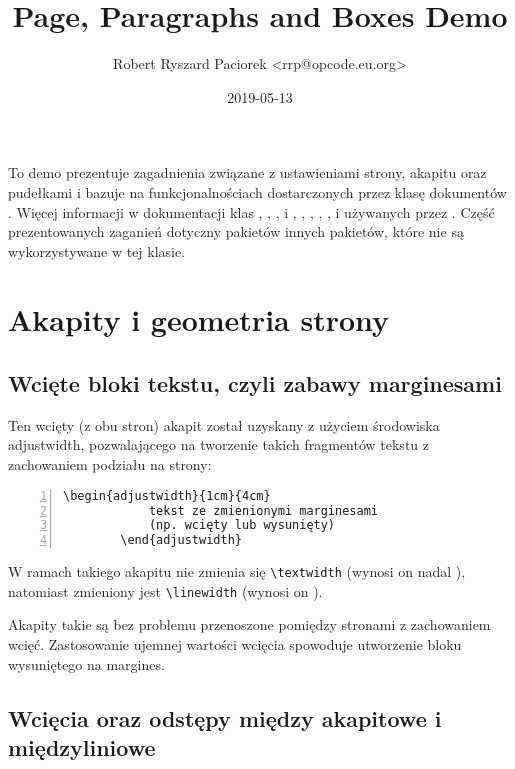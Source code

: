 \documentclass[fontSize=10pt,extra]{pdfArticle}
\title {Page, Paragraphs and Boxes Demo}
\author{Robert Ryszard Paciorek <rrp@opcode.eu.org>}
\date  {2019-05-13}
\begin{document}
To demo prezentuje zagadnienia związane z ustawieniami strony, akapitu oraz pudełkami i bazuje na funkcjonalnościach dostarczonych przez klasę dokumentów .
Więcej informacji w dokumentacji klas , , ,  i , , , , ,  i  używanych przez . Część prezentowanych zaganień dotyczny pakietów innych pakietów, które nie są wykorzystywane w tej klasie.

\section{Akapity i geometria strony}

\subsection{Wcięte bloki tekstu, czyli zabawy marginesami}

\begin{adjustwidth}{1cm}{4cm}
	Ten wcięty (z obu stron) akapit został uzyskany z użyciem środowiska adjustwidth,
	pozwalającego na tworzenie takich fragmentów tekstu z zachowaniem podziału na strony:
	
	\begin{minipage}{\linewidth}
	\begin{Verbatim}[gobble=2,numbers=left,numbersep=4pt,fontsize=\footnotesize]
		\begin{adjustwidth}{1cm}{4cm}
			tekst ze zmienionymi marginesami
			(np. wcięty lub wysunięty)
		\end{adjustwidth}
	\end{Verbatim}
	\end{minipage}
	
	W ramach takiego akapitu nie zmienia się \Verb#\textwidth# (wynosi on nadal \the\textwidth), natomiast zmieniony jest \Verb#\linewidth# (wynosi on \the\linewidth).
	
	Akapity takie są bez problemu przenoszone pomiędzy stronami z zachowaniem wcięć.
	Zastosowanie ujemnej wartości wcięcia spowoduje utworzenie bloku wysuniętego na margines.
\end{adjustwidth}


\subsection{Wcięcia oraz odstępy między akapitowe i międzyliniowe}
\end{document}
